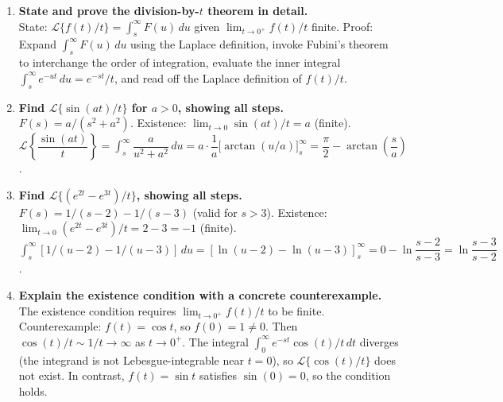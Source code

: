 \documentclass[12pt,a4paper]{article}
\begin{document}
\begin{enumerate}[leftmargin=2em, label=\textbf{D\arabic*.}]

\item \textbf{State and prove the division-by-$t$ theorem in detail.}\\
  State: $\mathcal{L}\{f(t)/t\}=\int_s^\infty F(u)\,du$ given
  $\lim_{t\to 0^+}f(t)/t$ finite.
  Proof: Expand $\int_s^\infty F(u)\,du$ using the Laplace definition,
  invoke Fubini's theorem to interchange the order of integration, evaluate
  the inner integral $\int_s^\infty e^{-ut}\,du = e^{-st}/t$, and read off
  the Laplace definition of $f(t)/t$.

\item \textbf{Find $\mathcal{L}\{\sin(at)/t\}$ for $a > 0$, showing all steps.}\\
  $F(s) = a/(s^2+a^2)$.
  Existence: $\lim_{t\to 0}\sin(at)/t = a$ (finite). \checkmark\\
  $\mathcal{L}\!\left\{\dfrac{\sin(at)}{t}\right\}
    = \int_s^\infty \dfrac{a}{u^2+a^2}\,du
    = a\cdot\dfrac{1}{a}\Big[\arctan(u/a)\Big]_s^\infty
    = \dfrac{\pi}{2} - \arctan\!\left(\dfrac{s}{a}\right)$.

\item \textbf{Find $\mathcal{L}\{(e^{2t}-e^{3t})/t\}$, showing all steps.}\\
  $F(s) = 1/(s-2) - 1/(s-3)$ (valid for $s > 3$).
  Existence: $\lim_{t\to 0}(e^{2t}-e^{3t})/t = 2-3 = -1$ (finite). \checkmark\\
  $\int_s^\infty [1/(u-2)-1/(u-3)]\,du
    = [\ln(u-2)-\ln(u-3)]_s^\infty
    = 0 - \ln\dfrac{s-2}{s-3} = \ln\dfrac{s-3}{s-2}$.

\item \textbf{Explain the existence condition with a concrete counterexample.}\\
  The existence condition requires $\lim_{t\to 0^+}f(t)/t$ to be finite.
  Counterexample: $f(t) = \cos t$, so $f(0)=1\neq 0$.
  Then $\cos(t)/t \sim 1/t \to \infty$ as $t\to 0^+$.
  The integral $\int_0^\infty e^{-st}\cos(t)/t\,dt$ diverges (the integrand
  is not Lebesgue-integrable near $t=0$), so $\mathcal{L}\{\cos(t)/t\}$ does not
  exist. In contrast, $f(t)=\sin t$ satisfies $\sin(0)=0$, so the condition holds.


\end{enumerate}
\end{document}
